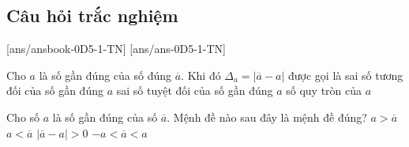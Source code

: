 \subsection{Câu hỏi trắc nghiệm}

[ans/ansbook-0D5-1-TN]
[ans/ans-0D5-1-TN]
\begin{ex}%
	Cho $a$ là số gần đúng của số đúng $\overline{a}$. Khi đó $\Delta_a = |\overline{a} - a|$ được gọi là 
	{sai số tương đối của số gần đúng $a$}
	{\True sai số tuyệt đối của số gần đúng $a$}
	{số quy tròn của $a$}
\end{ex}

\begin{ex}%
	Cho số $a$ là số gần đúng của số $\overline{a}$. Mệnh đề nào sau đây là mệnh đề đúng?
	\choice
	{$a>\overline{a}$}               
	{$a<\overline{a}$}
	{\True $|\overline{a}-a|>0$}
	{$-a<\overline{a}<a$}
\end{ex}


